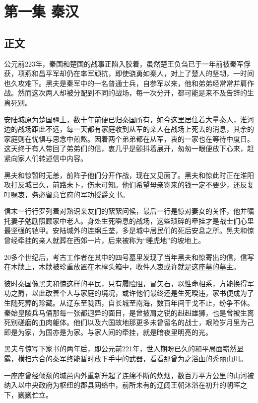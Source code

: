 \chapter{第一集 \quad 秦汉}


\section{正文}


公元前223年，秦国和楚国的战事正陷入胶着，虽然楚王负刍已于一年前被秦军俘获，项燕和昌平军却仍在率军顽抗，即使骁勇如秦人，对上了楚人的坚韧，一时间也久攻难下。黑夫是秦军中的一名普通士兵，自参军以来，他和弟弟经常常并肩作战。然而这次两人却被分配到不同的战场，每一次分开，都可能是来不及告辞的生离死别。

安陆城原为楚国疆土，数十年前便已归秦国所有，如今这里居住着大量秦人，淮河边的战场距此不远，每一天都有家庭收到从军的亲人在战场上死去的消息，其余的家庭则在忧惧与思念中煎熬。因着两个弟弟都在从军，衷的一家也在等待中度日。这天终于有人带回了弟弟们的信，衷几乎是颤抖着展开，匆匆一眼便放下心来，赶紧向家人们转述信中内容。

黑夫和惊暂时无恙，前阵子他们分开作战，现在又见面了。黑夫和惊此时正在淮阳攻打反城已久，前路未卜，伤未可知。他们希望母亲寄来的钱一定不要少，还反复叮嘱衷，务必留意官府的军功授爵文书。

信末一行行罗列着对熟识亲友们的絮絮问候，最后一行是惊对妻女的关怀，他并嘱托妻子勉励照顾家中老人。身处生死瞬息的战场，这些琐碎的牵挂才是战士们心里最坚强的铠甲。安陆城外的连绵丘垄，多是城中居民们的死后安息之所。黑夫和惊曾经牵挂的亲人就葬在西郊一片，后来被称为“睡虎地”的坡地上。

20多个世纪后，考古工作者在其中的四号墓里发现了当年黑夫和惊寄出的信，信写在木牍上，木牍被珍重放置在木椁头箱中，收件人衷或许就是这座墓的墓主。

彼时秦国像黑夫和惊这样的平民，只有履险阻，冒矢石，以性命相系，方能换得军功之爵，以此改善个人与家庭的境况，或许他们最终还是生死暌违，家书便成为了生随死葬的珍藏。从辽东至陇西，自长城至南海，数百年间干戈不止，纷争不休。秦始皇陵兵马俑那每一张都迥异的面目，是曾披肩之锐的赳赳雄狮，也是曾被生离死别磋磨的血肉躯体。他们以及六国故地那更多未曾留名的战士，艰险岁月里为己即是为家，为国亦是为家。与家人间的牵挂，就是暗夜里明亮的光。

黑夫与惊写下家书的两年后，即公元前221年，世人期盼已久的和平局面崭然显露，横扫六合的秦军终能暂时放下手中的武器，看看那曾为之浴血的秀丽山川。

一座座曾经倾颓的城邑内外重新升起了连绵不断的炊烟，数百万平方公里的山河被纳入以中央政府为枢纽的郡县网络中，前所未有的辽阔王朝沐浴在初升的朝晖之下，巍巍伫立。

